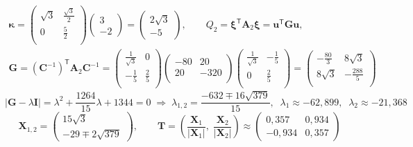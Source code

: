 \documentclass[12pt]{spbstu-task}
\begin{document}
\begin{gather*}
  \boldsymbol{\kappa} = \begin{pmatrix}
    \sqrt{3} & \frac{\sqrt{3}}{2} \\
    0 & \frac{5}{2} \\
  \end{pmatrix}\begin{pmatrix} 3 \\ -2 \end{pmatrix} = \begin{pmatrix} 2\sqrt{3} \\ -5 \end{pmatrix},\qquad
  Q_2 = \boldsymbol{\xi}^\mathsf{T}\mathbf{A}_2\boldsymbol{\xi} = \mathbf{u}^\mathsf{T}\mathbf{G}\mathbf{u}, \\
  \mathbf{G} = \left(\mathbf{C}^{-1}\right)^\mathsf{T}\mathbf{A}_2\mathbf{C}^{-1} =
  \begin{pmatrix}
    \frac{1}{\sqrt{3}} & 0 \\
    -\frac{1}{5} & \frac{2}{5} \\
  \end{pmatrix}\begin{pmatrix}
    -80 & 20 \\
    20 & -320 \\
  \end{pmatrix}\begin{pmatrix}
    \frac{1}{\sqrt{3}} & -\frac{1}{5} \\
    0 & \frac{2}{5} \\
  \end{pmatrix} =
  \begin{pmatrix}
    -\frac{80}{3} & 8\sqrt{3} \\
    8\sqrt{3} & -\frac{288}{5} \\
  \end{pmatrix}
\end{gather*}
\begin{displaymath}
  |\mathbf{G} - \lambda\mathbf{I}| = \lambda^2 + \frac{1264}{15}\lambda + 1344 = 0
  \;\Rightarrow\;
  \lambda_{1,2} = \frac{-632 \mp 16\sqrt{379}}{15},\;\;
  \lambda_1 \approx -62{,}899,\;\; \lambda_2 \approx -21{,}368
\end{displaymath}
\begin{displaymath}
  \mathbf{X}_{1,2} = \begin{pmatrix} 15\sqrt{3} \\ -29 \mp 2\sqrt{379} \end{pmatrix},\qquad
  \mathbf{T} = \left(\frac{\mathbf{X}_1}{|\mathbf{X}_1|},\; \frac{\mathbf{X}_2}{|\mathbf{X}_2|}\right) \approx \begin{pmatrix} 0{,}357 & 0{,}934 \\ -0{,}934 & 0{,}357 \end{pmatrix}
\end{displaymath}
\end{document}
